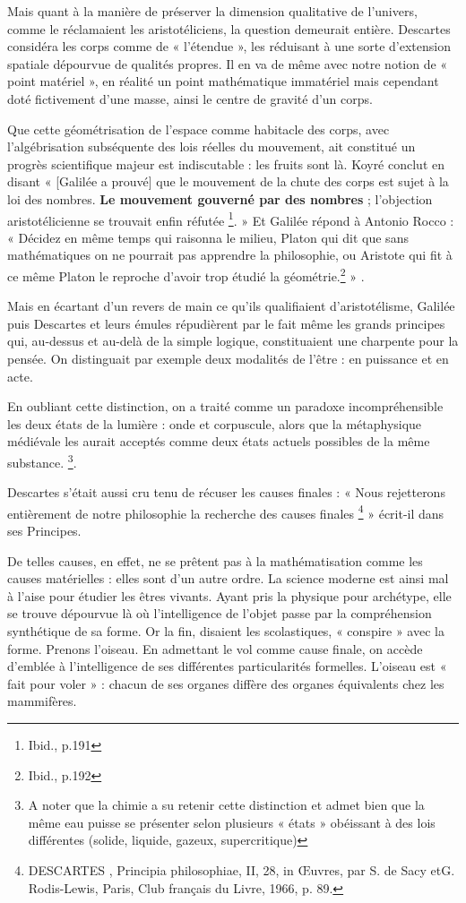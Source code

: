 \documentclass[a4paper,12pt]{article}
\begin{document}
Mais quant à la manière de préserver la dimension qualitative de l'univers, comme le réclamaient les aristotéliciens, la question demeurait entière. Descartes considéra les corps comme de « l'étendue », les réduisant à une sorte d'extension spatiale dépourvue de qualités propres. Il en va de même avec notre notion de « point matériel », en réalité un point mathématique immatériel mais cependant doté fictivement d'une masse, ainsi le centre de gravité d’un corps. 

Que cette géométrisation de l'espace comme habitacle des corps, avec l'algébrisation subséquente des lois réelles du mouvement, ait constitué un progrès scientifique majeur est indiscutable : les fruits sont là. Koyré conclut en disant « [Galilée a prouvé] que le mouvement de la chute des corps est sujet à la loi des nombres. \textbf{Le mouvement gouverné par des nombres} ; l'objection aristotélicienne se trouvait enfin réfutée \footnote{Ibid., p.191}. » Et Galilée répond à Antonio Rocco : « Décidez en même temps qui raisonna le milieu, Platon qui dit que sans mathématiques on ne pourrait pas apprendre la philosophie, ou Aristote qui fit à ce même Platon le reproche d'avoir trop étudié la géométrie.\footnote{Ibid., p.192} » .

Mais en écartant d'un revers de main ce qu'ils qualifiaient d’aristotélisme, Galilée puis Descartes et leurs émules répudièrent par le fait même les grands principes qui, au-dessus et au-delà de la simple logique, constituaient une charpente pour la pensée. On distinguait par exemple deux modalités de l’être : en puissance et en acte. 

En oubliant cette distinction, on a traité comme un paradoxe incompréhensible les deux états de la lumière : onde et corpuscule, alors que la métaphysique médiévale les aurait acceptés comme deux états actuels possibles de la même substance. \footnote{A noter que la chimie a su retenir cette distinction et admet bien que la même eau puisse se présenter selon plusieurs « états » obéissant à des lois différentes (solide, liquide, gazeux, supercritique)}. 

Descartes s'était aussi cru tenu de récuser les causes finales : « Nous rejetterons entièrement de notre philosophie la recherche des causes finales \footnote{DESCARTES , Principia philosophiae, II, 28, in Œuvres, par S. de Sacy etG. Rodis-Lewis, Paris, Club français du Livre, 1966, p. 89.} » écrit-il dans ses Principes. 

De telles causes, en effet, ne se prêtent pas à la mathématisation comme les causes matérielles : elles sont d'un autre ordre. La science moderne est ainsi mal à l'aise pour étudier les êtres vivants. Ayant pris la physique pour archétype, elle se trouve dépourvue là où l'intelligence de l'objet passe par la compréhension synthétique de sa forme. Or la fin, disaient les scolastiques, « conspire » avec la forme. Prenons l'oiseau. En admettant le vol comme cause finale, on accède d’emblée à l'intelligence de ses différentes particularités formelles. L'oiseau est « fait pour voler » : chacun de ses organes diffère des organes équivalents chez les mammifères. 
\end{document}
